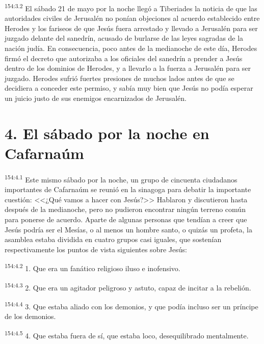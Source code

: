 \par 
\textsuperscript{154:3.2} El sábado 21 de mayo por la noche llegó a Tiberiades la noticia de que las autoridades civiles de Jerusalén no ponían objeciones al acuerdo establecido entre Herodes y los fariseos de que Jesús fuera arrestado y llevado a Jerusalén para ser juzgado delante del sanedrín, acusado de burlarse de las leyes sagradas de la nación judía. En consecuencia, poco antes de la medianoche de este día, Herodes firmó el decreto que autorizaba a los oficiales del sanedrín a prender a Jesús dentro de los dominios de Herodes, y a llevarlo a la fuerza a Jerusalén para ser juzgado. Herodes sufrió fuertes presiones de muchos lados antes de que se decidiera a conceder este permiso, y sabía muy bien que Jesús no podía esperar un juicio justo de sus enemigos encarnizados de Jerusalén.

\section*{4. El sábado por la noche en Cafarnaúm}
\par 
\textsuperscript{154:4.1} Este mismo sábado por la noche, un grupo de cincuenta ciudadanos importantes de Cafarnaúm se reunió en la sinagoga para debatir la importante cuestión: <<¿Qué vamos a hacer con Jesús?>> Hablaron y discutieron hasta después de la medianoche, pero no pudieron encontrar ningún terreno común para ponerse de acuerdo. Aparte de algunas personas que tendían a creer que Jesús podría ser el Mesías, o al menos un hombre santo, o quizás un profeta, la asamblea estaba dividida en cuatro grupos casi iguales, que sostenían respectivamente los puntos de vista siguientes sobre Jesús:

\par 
\textsuperscript{154:4.2} 1. Que era un fanático religioso iluso e inofensivo.

\par 
\textsuperscript{154:4.3} 2. Que era un agitador peligroso y astuto, capaz de incitar a la rebelión.

\par 
\textsuperscript{154:4.4} 3. Que estaba aliado con los demonios, y que podía incluso ser un príncipe de los demonios.

\par 
\textsuperscript{154:4.5} 4. Que estaba fuera de sí, que estaba loco, desequilibrado mentalmente.

